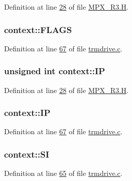 Definition at line \hyperlink{_m_p_x___r3_8_h_source_l00028}{28} of file \hyperlink{_m_p_x___r3_8_h_source}{MPX\_\-R3.H}.

\hypertarget{structcontext_ad4e1a32a11367c9584e6d0cbbde8c0de}{
\subsubsection[{FLAGS}]{ {\bf context::FLAGS}}}
\label{structcontext_ad4e1a32a11367c9584e6d0cbbde8c0de}


Definition at line \hyperlink{trmdrive_8c_source_l00067}{67} of file \hyperlink{trmdrive_8c_source}{trmdrive.c}.

\hypertarget{structcontext_a02ac427e75af0dfe7d649dc8821cde0a}{
\subsubsection[{IP}]{\setlength{\rightskip}{0pt plus 5cm}unsigned int {\bf context::IP}}}
\label{structcontext_a02ac427e75af0dfe7d649dc8821cde0a}


Definition at line \hyperlink{_m_p_x___r3_8_h_source_l00028}{28} of file \hyperlink{_m_p_x___r3_8_h_source}{MPX\_\-R3.H}.

\hypertarget{structcontext_aed5e26918558117081c7d87f485577ee}{
\subsubsection[{IP}]{ {\bf context::IP}}}
\label{structcontext_aed5e26918558117081c7d87f485577ee}


Definition at line \hyperlink{trmdrive_8c_source_l00067}{67} of file \hyperlink{trmdrive_8c_source}{trmdrive.c}.

\hypertarget{structcontext_ad8b8154f6a98c5e72b28e6031f135c74}{
\subsubsection[{SI}]{ {\bf context::SI}}}
\label{structcontext_ad8b8154f6a98c5e72b28e6031f135c74}


Definition at line \hyperlink{trmdrive_8c_source_l00065}{65} of file \hyperlink{trmdrive_8c_source}{trmdrive.c}.

